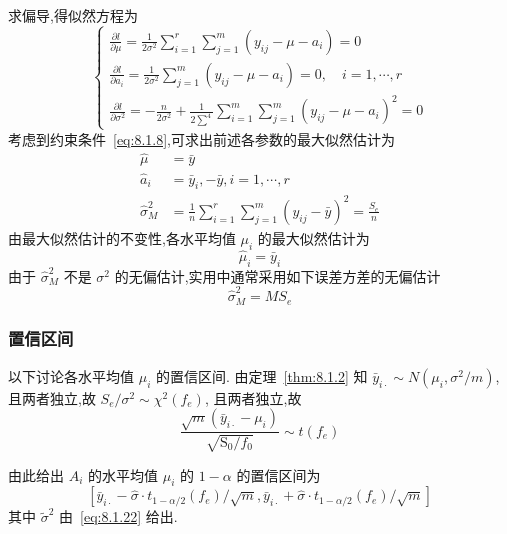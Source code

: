 求偏导,得似然方程为
\begin{equation*}
  \begin{cases}
    \frac{\partial l}{\partial \mu} =\frac{1}{2 \sigma^{2}} \sum_{i=1}^{r} \sum_{j=1}^{m}\left(y_{i j}-\mu-a_{i}\right)=0 \\
    \frac{\partial l}{\partial a_{i}} =\frac{1}{2 \sigma^{2}} \sum_{j=1}^{m}\left(y_{i j}-\mu-a_{i}\right)=0, \quad i=1, \cdots, r\\
    \frac{\partial l}{\partial \sigma^{2}} =-\frac{n}{2 \sigma^{2}}+\frac{1}{2 \sum^{4}} \sum_{i=1}^{m} \sum_{j=1}^{m}\left(y_{i j}-\mu-a_{i}\right)^{2}=0
  \end{cases}
\end{equation*}
考虑到约束条件~\eqref{eq:8.1.8},可求出前述各参数的最大似然估计为
\begin{equation}
  \label{eq:8.1.20}
  \begin{split}
    \hat{\mu} &= \bar{y}\\
    \hat{a}_{i} & =\bar{y}_{i},-\bar{y}, i=1, \cdots, r \\
    \hat{\sigma}_{M}^{2} &= \frac{1}{n} \sum_{i=1}^{r} \sum_{j=1}^{m}\left(y_{i j}-\bar{y}\right)^{2}=\frac{S_{e}}{n}
  \end{split}
\end{equation}
由最大似然估计的不变性,各水平均值 $\mu_i$ 的最大似然估计为
\begin{equation}
  \label{eq:8.1.21}
  \hat{\mu}_{i}=\bar{y}_{i}
\end{equation}
由于 $\hat{\sigma}_{M}^{2}$ 不是 $\sigma^2$ 的无偏估计,实用中通常采用如下误差方差的无偏估计
\begin{equation}
  \label{eq:8.1.22}
  \hat{\sigma}_{M}^{2} = M S_{e}
\end{equation}

\subsubsection{置信区间}

以下讨论各水平均值 $\mu_i$ 的置信区间. 由定理~\ref{thm:8.1.2} 知 $\bar{y}_{i\cdot} \sim N (\mu_{i}, \sigma^{2}/m)$,且两者独立,故 $S_e/\sigma^2 \sim \chi^2(f_e)$, 且两者独立,故
\begin{equation*}
  \frac{\sqrt{m}\left(\bar{y}_{i\cdot}-\mu_{i}\right)}{\sqrt{\mathrm{S}_{0} / f_{0}}} \sim t\left(f_{e}\right)
\end{equation*}

由此给出 $A_i$ 的水平均值 $\mu_i$ 的 $1-\alpha$ 的置信区间为
\begin{equation}\label{eq:8.1.23}
  \left[\bar{y}_{i\cdot}-\hat{\sigma} \cdot t_{1-\alpha / 2}(f_{e}) / \sqrt{m}, \bar{y}_{i\cdot}+\hat{\sigma} \cdot t_{1-\alpha / 2}(f_{e}) / \sqrt{m}\right]
\end{equation}
其中 $\tilde{\sigma}^2$ 由~\eqref{eq:8.1.22} 给出.

